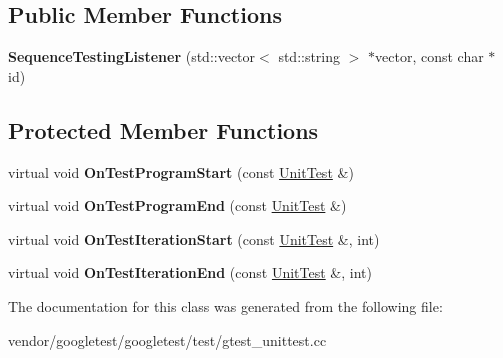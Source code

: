 \subsection*{Public Member Functions}
\begin{DoxyCompactItemize}
\item 
\mbox{\label{class_sequence_testing_listener_ac0fcb350d20876f8273621ad4c79ba7a}} 
{\bfseries Sequence\+Testing\+Listener} (std\+::vector$<$ std\+::string $>$ $\ast$vector, const char $\ast$id)
\end{DoxyCompactItemize}
\subsection*{Protected Member Functions}
\begin{DoxyCompactItemize}
\item 
\mbox{\label{class_sequence_testing_listener_a25b96acdbaa6f582e583e6b56bd39b42}} 
virtual void {\bfseries On\+Test\+Program\+Start} (const \hyperlink{classtesting_1_1_unit_test}{Unit\+Test} \&)
\item 
\mbox{\label{class_sequence_testing_listener_aacac5e15bac089460841ff63a5c31f57}} 
virtual void {\bfseries On\+Test\+Program\+End} (const \hyperlink{classtesting_1_1_unit_test}{Unit\+Test} \&)
\item 
\mbox{\label{class_sequence_testing_listener_a345641262fa10cc4b251ac54116db74b}} 
virtual void {\bfseries On\+Test\+Iteration\+Start} (const \hyperlink{classtesting_1_1_unit_test}{Unit\+Test} \&, int)
\item 
\mbox{\label{class_sequence_testing_listener_a783bc01e2a95f5bf73bbde4d96832e0f}} 
virtual void {\bfseries On\+Test\+Iteration\+End} (const \hyperlink{classtesting_1_1_unit_test}{Unit\+Test} \&, int)
\end{DoxyCompactItemize}


The documentation for this class was generated from the following file\+:\begin{DoxyCompactItemize}
\item 
vendor/googletest/googletest/test/gtest\+\_\+unittest.\+cc\end{DoxyCompactItemize}
